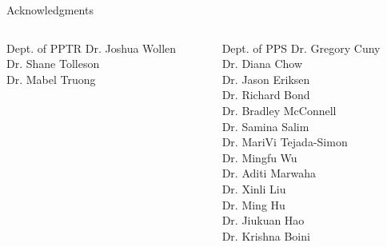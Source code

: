 \begin{frame}{Acknowledgments}
\begin{columns}[T]
\begin{column}{0.3\textwidth}
\begin{block}{Dept. of PPTR}
      Dr. Joshua Wollen \\
      Dr. Shane Tolleson \\
      Dr. Mabel Truong \\
    \end{block}
  \end{column}
  \begin{column}{0.5\textwidth}
    \begin{block}{Dept. of PPS}
      Dr. Gregory Cuny \\
      Dr. Diana Chow \\
      Dr. Jason Eriksen \\
      Dr. Richard Bond \\
      Dr. Bradley McConnell \\
      Dr. Samina Salim \\
      Dr. MariVi Tejada-Simon \\
      Dr. Mingfu Wu \\
      Dr. Aditi Marwaha \\
      Dr. Xinli Liu \\
      Dr. Ming Hu \\
      Dr. Jiukuan Hao \\
      Dr. Krishna Boini \\
    \end{block}
  \end{column} 
\end{columns}
\end{frame}